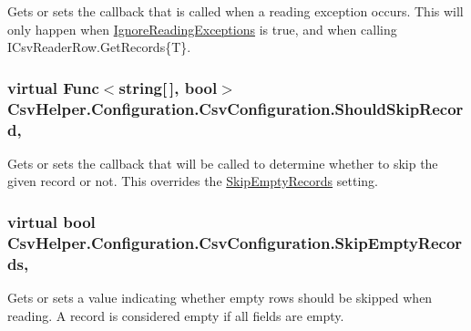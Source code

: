 Gets or sets the callback that is called when a reading exception occurs. This will only happen when \hyperlink{a00043_a8645dbd4fe2a9c443910695a93b1027f}{Ignore\-Reading\-Exceptions} is true, and when calling I\-Csv\-Reader\-Row.\-Get\-Records\{\-T\}. 

\hypertarget{a00043_a04c1a9d83f8fe89a23c86def5b8558fb}{
\subsubsection[{Should\-Skip\-Record}]{\setlength{\rightskip}{0pt plus 5cm}virtual Func$<$string\mbox{[}$\,$\mbox{]}, bool$>$ Csv\-Helper.\-Configuration.\-Csv\-Configuration.\-Should\-Skip\-Record\hspace{0.3cm}{\ttfamily [get]}, {\ttfamily [set]}}}\label{a00043_a04c1a9d83f8fe89a23c86def5b8558fb}


Gets or sets the callback that will be called to determine whether to skip the given record or not. This overrides the \hyperlink{a00043_a416ecf54fed4d9c3e90ebfd0b352663d}{Skip\-Empty\-Records} setting. 

\hypertarget{a00043_a416ecf54fed4d9c3e90ebfd0b352663d}{
\subsubsection[{Skip\-Empty\-Records}]{\setlength{\rightskip}{0pt plus 5cm}virtual bool Csv\-Helper.\-Configuration.\-Csv\-Configuration.\-Skip\-Empty\-Records\hspace{0.3cm}{\ttfamily [get]}, {\ttfamily [set]}}}\label{a00043_a416ecf54fed4d9c3e90ebfd0b352663d}


Gets or sets a value indicating whether empty rows should be skipped when reading. A record is considered empty if all fields are empty. 

